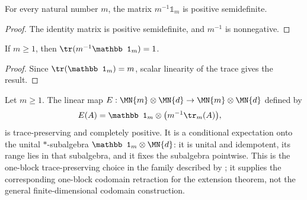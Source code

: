 \begin{theorem}
    \label{thm:maximally_mixed_pos}
    \leanok
    For every natural number $m$, the matrix $m^{-1}\mathbb1_m$ is positive
    semidefinite.
\end{theorem}
\begin{proof}
    \leanok
    The identity matrix is positive semidefinite, and $m^{-1}$ is nonnegative.
\end{proof}

\begin{theorem}
    \label{thm:maximally_mixed_trace}
    \leanok
    If $m\geq1$, then $\tr(m^{-1}\mathbb1_m)=1$.
\end{theorem}
\begin{proof}
    \leanok
    Since $\tr(\mathbb1_m)=m$, scalar linearity of the trace gives the result.
\end{proof}

\begin{theorem}
    \label{thm:right_factor_conditional_expectation}
    \leanok
    Let $m\geq1$. The linear map
    $E:\MN{m}\otimes\MN{d}\to\MN{m}\otimes\MN{d}$ defined by
    \begin{align}
        E(A)&=\mathbb1_m\otimes\bigl(m^{-1}\tr_{m}(A)\bigr),
        \notag
    \end{align}
    is trace-preserving and completely positive. It is a conditional
    expectation onto the unital $*$-subalgebra
    $\mathbb1_m\otimes\MN{d}$: it is unital and idempotent, its range lies
    in that subalgebra, and it fixes the subalgebra pointwise. This is the
    one-block trace-preserving choice in the family described by
    \cite[Proposition~1.5 and Equation~(1.40)]{Wolf2012Quantum}; it supplies
    the corresponding one-block codomain retraction for the extension
    theorem, not the general finite-dimensional codomain construction.
\end{theorem}

